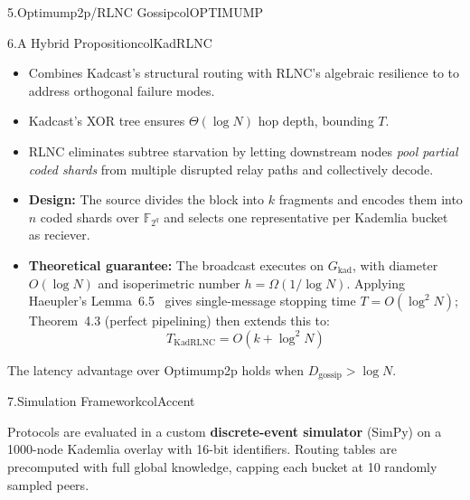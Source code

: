 \documentclass[final]{beamer}
\newcommand{\pbody}{\fontsize{21}{27}\selectfont}
\newlength{\colwidth}
\begin{document}
\begin{frame}[t]
\begin{columns}[T, totalwidth=0.97\paperwidth]
\begin{column}{\colwidth}
\begin{panel}{5.\enspace Optimump2p/RLNC Gossip}{colOPTIMUMP}
\end{panel}


\vspace{6mm}


\begin{panel}{6.\enspace A Hybrid Proposition}{colKadRLNC}
  \pbody\justifying

  \begin{itemize}\setlength\itemsep{4pt}
    \item Combines Kadcast's structural routing with RLNC's algebraic resilience to to address orthogonal failure modes.
    \item Kadcast's XOR tree ensures $\Theta(\log N)$ hop depth, bounding $T$.
    \item RLNC eliminates subtree starvation by letting downstream nodes \emph{pool partial coded shards} from multiple disrupted relay paths and collectively decode.
    \item \textbf{Design:} The source divides the block into $k$ fragments and encodes them into $n$ coded shards over $\mathbb{F}_{2^q}$ and selects one representative per Kademlia bucket as reciever.
    \item \textbf{Theoretical guarantee:} The broadcast executes on $G_{\mathrm{kad}}$, with diameter $O(\log N)$ and isoperimetric number $h = \Omega(1/\log N)$. Applying Haeupler's Lemma~6.5~\cite{haeupler2010} gives single-message stopping time $T = O(\log^2 N)$; Theorem~4.3 (perfect pipelining) then extends this to:
    \[
      T_{\mathrm{KadRLNC}} = O\!\left(k + \log^2 N\right)
    \]
  \end{itemize}
  The latency advantage over Optimump2p holds when $D_{\mathrm{gossip}} > \log N$.
\end{panel}


\vspace{6mm}


\begin{panel}{7.\enspace Simulation Framework}{colAccent} 
  \pbody\justifying

  Protocols are evaluated in a custom \textbf{discrete-event simulator} (SimPy) on a 1000-node Kademlia overlay with 16-bit identifiers. Routing tables are precomputed with full global knowledge, capping each bucket at 10 randomly sampled peers.

  \vspace{5pt}


\end{panel}
\end{column}
\end{columns}
\end{frame}
\end{document}
